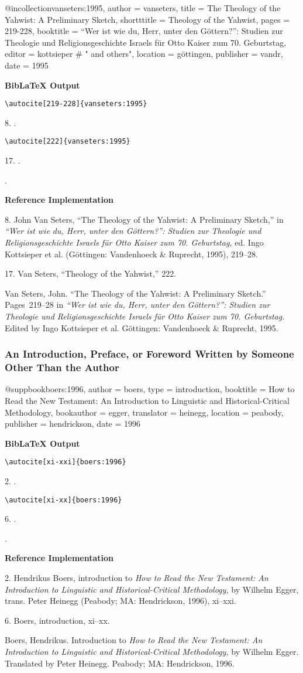 \documentclass[a4paper]{article}
\newcommand\citetest[5]{%
  {\textbf{BibLaTeX Output}\par
   \nobreak
   \texttt{\textbackslash autocite[#2]\{#5\}}\par
   \color{biblatex-colour}
   #1. \cite[#2]{#5}.\par
   \color{black}
   \texttt{\textbackslash autocite[#4]\{#5\}}\par
   \color{biblatex-colour}
   #3. \cite[#4]{#5}.\par
   \hangindent\bibindent\bibentrycite{#5}.\par}}
\newenvironment{refimp}{%
  \begin{minipage}{\linewidth}
    \setlength{\parskip}{1ex}
    \textbf{Reference Implementation}\par
    \nobreak
    \color{reference-colour}
}{\end{minipage}}
\newenvironment{vb}{%
  \setlength{\parskip}{0pt}
  \verbatim}{\endverbatim}
\begin{document}
\begin{vb}
@incollection{vanseters:1995,
  author = vanseters,
  title = {The Theology of the Yahwist: A Preliminary Sketch},
  shortttitle = {Theology of the Yahwist},
  pages = {219-228},
  booktitle = {“Wer ist wie du, Herr, unter den Göttern?”:
               Studien zur Theologie und Religionsgeschichte
               Israels für Otto Kaiser zum 70. Geburtstag},
  editor = kottsieper # " and others",
  location = göttingen,
  publisher = vandr,
  date = {1995}
}
\end{vb}  

\citetest{8}{219-228}{17}{222}{vanseters:1995}

\begin{refimp}
  8. John Van Seters, “The Theology of the Yahwist: A Preliminary Sketch,” in
  \emph{“Wer ist wie du, Herr, unter den Göttern?”: Studien zur Theologie und
  Religionsgeschichte Israels für Otto Kaiser zum 70. Geburtstag,} ed. Ingo
  Kottsieper et al. (Göttingen: Vandenhoeck \& Ruprecht, 1995), 219–28.

  17. Van Seters, “Theology of the Yahwist,” 222.

  \hangindent\bibindent Van Seters, John. “The Theology of the Yahwist: A
  Preliminary Sketch.” Pages~219–28 in \emph{“Wer ist wie du, Herr, unter den
  Göttern?”: Studien zur Theologie und Religionsgeschichte Israels für Otto
  Kaiser zum 70. Geburtstag.} Edited by Ingo Kottsieper et al. Göttingen:
  Vandenhoeck \& Ruprecht, 1995.
\end{refimp}

\subsubsection{An Introduction, Preface, or Foreword Written by Someone Other
Than the Author}

\begin{vb}
@suppbook{boers:1996,
  author = boers,
  type = {introduction},
  booktitle = {How to Read the New Testament: An Introduction to
               Linguistic and Historical-Critical Methodology},
  bookauthor = egger,
  translator = heinegg,
  location = peabody,
  publisher = hendrickson,
  date = {1996}
}
\end{vb}  

\citetest{2}{xi-xxi}{6}{xi-xx}{boers:1996}

\begin{refimp}
  2. Hendrikus Boers, introduction to \emph{How to Read the New Testament: An
  Introduction to Linguistic and Historical-Critical Methodology,} by Wilhelm
  Egger, trans. Peter Heinegg (Peabody; MA: Hendrickson, 1996), xi–xxi.

  6. Boers, introduction, xi–xx.

  \hangindent\bibindent Boers, Hendrikus. Introduction to \emph{How to Read
  the New Testament: An Introduction to Linguistic and Historical-Critical
  Methodology,} by Wilhelm Egger. Translated by Peter Heinegg. Peabody; MA:
  Hendrickson, 1996.
\end{refimp}
\end{document}
